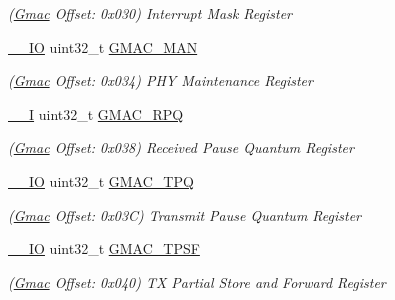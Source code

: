 \begin{DoxyCompactItemize}
\begin{DoxyCompactList}\small\item\em (\mbox{\hyperlink{structGmac}{Gmac}} Offset\+: 0x030) Interrupt Mask Register \end{DoxyCompactList}\item 
\mbox{\label{structGmac_a5870bb51263136d83a8b034e78df1c42}} 
\mbox{\hyperlink{core__cm7_8h_aec43007d9998a0a0e01faede4133d6be}{\+\_\+\+\_\+\+IO}} uint32\+\_\+t \mbox{\hyperlink{structGmac_a5870bb51263136d83a8b034e78df1c42}{G\+M\+A\+C\+\_\+\+M\+AN}}
\begin{DoxyCompactList}\small\item\em (\mbox{\hyperlink{structGmac}{Gmac}} Offset\+: 0x034) P\+HY Maintenance Register \end{DoxyCompactList}\item 
\mbox{\label{structGmac_ae3c65f6f2b228c62074b47df903c8cb4}} 
\mbox{\hyperlink{core__cm7_8h_af63697ed9952cc71e1225efe205f6cd3}{\+\_\+\+\_\+I}} uint32\+\_\+t \mbox{\hyperlink{structGmac_ae3c65f6f2b228c62074b47df903c8cb4}{G\+M\+A\+C\+\_\+\+R\+PQ}}
\begin{DoxyCompactList}\small\item\em (\mbox{\hyperlink{structGmac}{Gmac}} Offset\+: 0x038) Received Pause Quantum Register \end{DoxyCompactList}\item 
\mbox{\label{structGmac_adee8b219bcba7ba2efbdac382232e8e1}} 
\mbox{\hyperlink{core__cm7_8h_aec43007d9998a0a0e01faede4133d6be}{\+\_\+\+\_\+\+IO}} uint32\+\_\+t \mbox{\hyperlink{structGmac_adee8b219bcba7ba2efbdac382232e8e1}{G\+M\+A\+C\+\_\+\+T\+PQ}}
\begin{DoxyCompactList}\small\item\em (\mbox{\hyperlink{structGmac}{Gmac}} Offset\+: 0x03C) Transmit Pause Quantum Register \end{DoxyCompactList}\item 
\mbox{\label{structGmac_a9d83a82d402354747221fd56c541a5c7}} 
\mbox{\hyperlink{core__cm7_8h_aec43007d9998a0a0e01faede4133d6be}{\+\_\+\+\_\+\+IO}} uint32\+\_\+t \mbox{\hyperlink{structGmac_a9d83a82d402354747221fd56c541a5c7}{G\+M\+A\+C\+\_\+\+T\+P\+SF}}
\begin{DoxyCompactList}\small\item\em (\mbox{\hyperlink{structGmac}{Gmac}} Offset\+: 0x040) TX Partial Store and Forward Register \end{DoxyCompactList}\item 

\end{DoxyCompactItemize}
